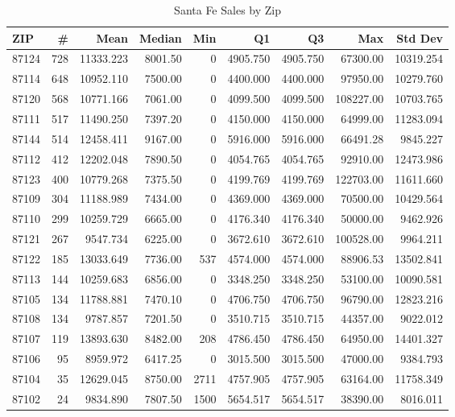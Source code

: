 \documentclass[
]{article}
\begin{document}
\begin{table}
\caption{\label{tab:Metro maps}Santa Fe Sales by Zip}
\centering
\begin{tabular}[t]{l|r|r|r|r|r|r|r|r}
\hline
ZIP & \# & Mean & Median & Min & Q1 & Q3 & Max & Std Dev\\
\hline
87124 & 728 & 11333.223 & 8001.50 & 0 & 4905.750 & 4905.750 & 67300.00 & 10319.254\\
\hline
87114 & 648 & 10952.110 & 7500.00 & 0 & 4400.000 & 4400.000 & 97950.00 & 10279.760\\
\hline
87120 & 568 & 10771.166 & 7061.00 & 0 & 4099.500 & 4099.500 & 108227.00 & 10703.765\\
\hline
87111 & 517 & 11490.250 & 7397.20 & 0 & 4150.000 & 4150.000 & 64999.00 & 11283.094\\
\hline
87144 & 514 & 12458.411 & 9167.00 & 0 & 5916.000 & 5916.000 & 66491.28 & 9845.227\\
\hline
87112 & 412 & 12202.048 & 7890.50 & 0 & 4054.765 & 4054.765 & 92910.00 & 12473.986\\
\hline
87123 & 400 & 10779.268 & 7375.50 & 0 & 4199.769 & 4199.769 & 122703.00 & 11611.660\\
\hline
87109 & 304 & 11188.989 & 7434.00 & 0 & 4369.000 & 4369.000 & 70500.00 & 10429.564\\
\hline
87110 & 299 & 10259.729 & 6665.00 & 0 & 4176.340 & 4176.340 & 50000.00 & 9462.926\\
\hline
87121 & 267 & 9547.734 & 6225.00 & 0 & 3672.610 & 3672.610 & 100528.00 & 9964.211\\
\hline
87122 & 185 & 13033.649 & 7736.00 & 537 & 4574.000 & 4574.000 & 88906.53 & 13502.841\\
\hline
87113 & 144 & 10259.683 & 6856.00 & 0 & 3348.250 & 3348.250 & 53100.00 & 10090.581\\
\hline
87105 & 134 & 11788.881 & 7470.10 & 0 & 4706.750 & 4706.750 & 96790.00 & 12823.216\\
\hline
87108 & 134 & 9787.857 & 7201.50 & 0 & 3510.715 & 3510.715 & 44357.00 & 9022.012\\
\hline
87107 & 119 & 13893.630 & 8482.00 & 208 & 4786.450 & 4786.450 & 64950.00 & 14401.327\\
\hline
87106 & 95 & 8959.972 & 6417.25 & 0 & 3015.500 & 3015.500 & 47000.00 & 9384.793\\
\hline
87104 & 35 & 12629.045 & 8750.00 & 2711 & 4757.905 & 4757.905 & 63164.00 & 11758.349\\
\hline
87102 & 24 & 9834.890 & 7807.50 & 1500 & 5654.517 & 5654.517 & 38390.00 & 8016.011\\

\end{tabular}
\end{table}
\end{document}
